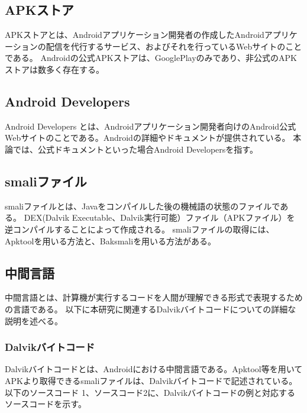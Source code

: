 \subsection{APKストア}
APKストアとは、Androidアプリケーション開発者の作成したAndroidアプリケーションの配信を代行するサービス、およびそれを行っているWebサイトのことである。
Androidの公式APKストアは、GooglePlay\cite{GooglePlay}のみであり、非公式のAPKストアは数多く存在する。


\subsection{Android Developers}
Android Developers とは、Androidアプリケーション開発者向けのAndroid公式Webサイトのことである\cite{Android_Developers}。Androidの詳細やドキュメントが提供されている。
本論では、公式ドキュメントといった場合Android Developersを指す。


\subsection{smaliファイル}
smaliファイルとは、Javaをコンパイルした後の機械語の状態のファイルである。
DEX(Dalvik Executable、Dalvik実行可能）ファイル（APKファイル）を逆コンパイルすることによって作成される。
smaliファイルの取得には、Apktool\cite{Apktool}を用いる方法と、Baksmali\cite{Baksmali}を用いる方法がある。



\subsection{中間言語}
中間言語とは、計算機が実行するコードを人間が理解できる形式で表現するための言語である。
以下に本研究に関連するDalvikバイトコードについての詳細な説明を述べる。


\subsubsection{Dalvikバイトコード}
Dalvikバイトコードとは、Androidにおける中間言語である。Apktool等を用いてAPKより取得できるsmaliファイルは、Dalvikバイトコードで記述されている。以下のソースコード 1、ソースコード2に、Dalvikバイトコードの例と対応するソースコードを示す。

